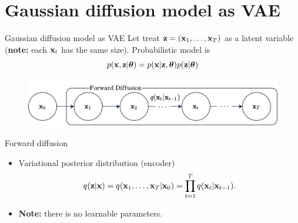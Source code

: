 \section{Gaussian diffusion model as VAE}
\begin{frame}{Gaussian diffusion model as VAE}
	Let treat $\mathbf{z} = (\mathbf{x}_1, \dots, \mathbf{x}_T)$ as a latent variable (\textbf{note:} each $\mathbf{x}_t$ has the same size). Probabilistic model is
		\[
			p(\mathbf{x}, \mathbf{z} | \boldsymbol{\theta}) = p(\mathbf{x} | \mathbf{z}, \boldsymbol{\theta}) p(\mathbf{z} | \boldsymbol{\theta})
		\]	
		\vspace{-0.4cm}
	\begin{figure}
		\includegraphics[width=0.8\linewidth]{figs/diffusion_pgm_forward}
	\end{figure}
	\begin{block}{Forward diffusion}
		\begin{itemize}
			\item Variational posterior distribution (encoder)
			\vspace{-0.4cm}
			\[
				q(\mathbf{z} | \mathbf{x}) = q(\mathbf{x}_1, \dots, \mathbf{x}_T | \mathbf{x}_0) = \prod_{t = 1}^T q(\mathbf{x}_t | \mathbf{x}_{t - 1}).
			\]
			\item \textbf{Note:} there is no learnable parameters.
		\end{itemize}
		\vspace{-0.5cm}
	\end{block}
\end{frame}
